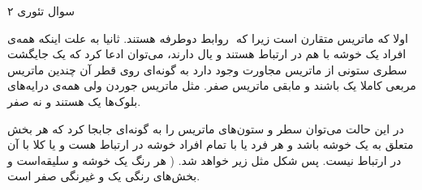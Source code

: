سوال تئوری ۲

اولا که ماتریس متقارن است زیرا که ‍ روابط دوطرفه هستند. ثانیا به علت اینکه همه‌ی افراد یک خوشه با هم در ارتباط هستند و یال دارند، می‌توان ادعا کرد که یک جایگشت سطری ستونی از ماتریس مجاورت وجود دارد به گونه‌ای روی قطر آن چندین ماتریس مربعی کاملا یک باشند و مابقی ماتریس صفر. مثل ماتریس جوردن ولی همه‌ی درایه‌های بلوک‌ها یک هستند و نه صفر.

در این حالت می‌توان سطر و ستون‌های ماتریس را به ‌گونه‌ای جابجا کرد که هر بخش متعلق به یک خوشه باشد و هر فرد یا با تمام افراد خوشه در ارتباط هست و یا کلا با آن در ارتباط نیست. پس شکل مثل زیر خواهد شد. ( هر رنگ یک خوشه و سلیقه‌است و بخش‌های رنگی یک و غیرنگی صفر است.

